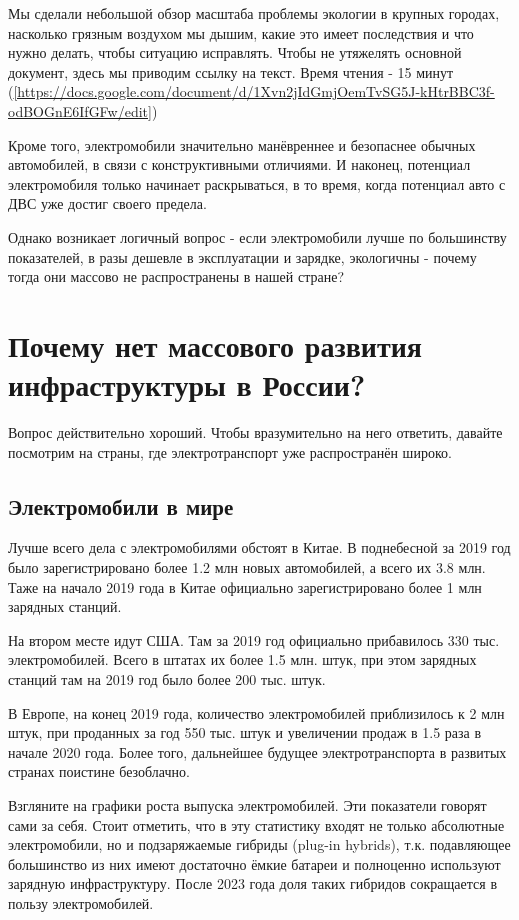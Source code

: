 \documentclass[a4paper,12pt]{report}
\begin{document}
Мы сделали небольшой обзор масштаба проблемы экологии в крупных городах, насколько грязным воздухом мы дышим, какие это имеет последствия и что нужно делать, чтобы ситуацию исправлять. Чтобы не утяжелять основной документ, здесь мы приводим ссылку на текст. Время чтения - 15 минут (\ref {https://docs.google.com/document/d/1Xvn2jIdGmjOemTvSG5J-kHtrBBC3f-odBOGnE6IfGFw/edit})

Кроме того, электромобили значительно манёвреннее и безопаснее обычных автомобилей, в связи с конструктивными отличиями. И наконец, потенциал электромобиля только начинает раскрываться, в то время, когда потенциал авто с ДВС уже достиг своего предела.

Однако возникает логичный вопрос - если электромобили лучше по большинству показателей, в разы дешевле в эксплуатации и зарядке, экологичны - почему тогда они массово не распространены в нашей стране? 



\chapter{Почему нет массового развития инфраструктуры в России?}
Вопрос действительно хороший. Чтобы вразумительно на него ответить, давайте посмотрим на страны, где электротранспорт уже распространён широко. 

\section{Электромобили в мире}
Лучше всего дела с электромобилями обстоят в Китае. В поднебесной за 2019 год было зарегистрировано более 1.2 млн новых автомобилей, а всего их 3.8 млн. Таже на начало 2019 года в Китае официально зарегистрировано более 1 млн зарядных станций.

На втором месте идут США. Там за 2019 год официально прибавилось 330 тыс. электромобилей. Всего в штатах их более 1.5 млн. штук, при этом зарядных станций там на 2019 год было более 200 тыс. штук.

В Европе, на конец 2019 года, количество электромобилей приблизилось к 2 млн штук, при проданных за год 550 тыс. штук и увеличении продаж в 1.5 раза в начале 2020 года.
Более того, дальнейшее будущее электротранспорта в развитых странах поистине безоблачно. 

Взгляните на графики роста выпуска электромобилей. Эти показатели говорят сами за себя. Стоит отметить, что в эту статистику входят не только абсолютные электромобили, но и подзаряжаемые гибриды (plug-in hybrids), т.к. подавляющее большинство из них имеют достаточно ёмкие батареи и полноценно используют зарядную инфраструктуру.
После 2023 года доля таких гибридов сокращается в пользу электромобилей.
\end{document}
